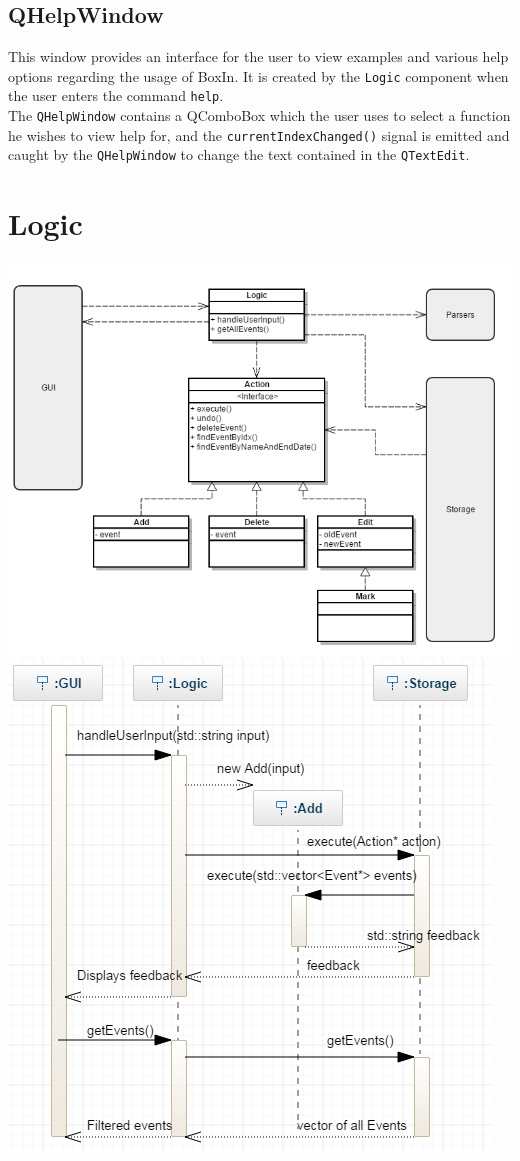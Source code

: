 \documentclass[12pt]{extarticle}
\begin{document}
\subsection{QHelpWindow}
This window provides an interface for the user to view examples and various help options regarding the usage of BoxIn. It is created by the \texttt{Logic} component when the user enters the command \texttt{help}.\\
The \texttt{QHelpWindow} contains a QComboBox which the user uses to select a function he wishes to view help for, and the \texttt{currentIndexChanged()} signal is emitted and caught by the \texttt{QHelpWindow} to change the text contained in the \texttt{QTextEdit}.\\


\section{Logic}
\includegraphics[width=\textwidth /2, height=\textheight / 3]{logic_class_diagram}
\includegraphics[width=\textwidth /2, height = \textheight / 3]{add_call_diagram}
\end{document}
